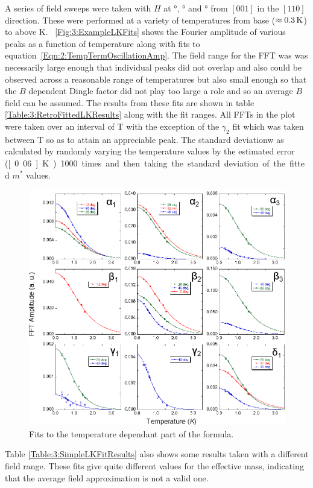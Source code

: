 A series of field sweeps were taken with $H$ at \unit[12]{\degree}, \unit[28]{\degree} and \unit[46]{\degree} from $[001]$ in the $[110]$ direction. These were performed at a variety of temperatures from base ($\approx\unit[0.3]{K}$) to above \unit[2]{K}. \Fig~\ref{Fig:3:ExampleLKFits} shows the Fourier amplitude of various peaks as a function of temperature along with fits to equation~\ref{Eqn:2:TempTermOscillationAmp}. The field range for the FFT was was necessarily large enough that individual peaks did not overlap and also could be observed across a reasonable range of temperatures but also small enough so that the $B$ dependent Dingle factor did not play too large a role and so an average $B$ field can be assumed. The results from these fits are shown in table \ref{Table:3:RetroFittedLKResults} along with the fit ranges. All FFTs in the plot were taken over an interval of \unit[12--18]{T} with the exception of the $\gamma_2$ fit which was taken between \unit[16-18]{T} so as to attain an appreciable peak. The standard deviationw as calculated by randomly varying the temperature values by the estimated error (\unit[0.06]{K}) 1000 times and then taking the standard deviation of the fitted $m^*$ values.
\begin{figure}[h!]
    \begin{center}
        \includegraphics[scale=0.9]{Chapter3-dHvABaFe2P2/Figures/Mass/SimpleLKFits/SimpleLKFits}
        \caption{Fits to the temperature dependant part of the \LK formula. }
        \label{Fig:3:SimpleLKFits}
    \end{center}
\end{figure}
Table \ref{Table:3:SimpleLKFitResults} also shows some results taken with a different field range. These fits give quite different values for the effective mass, indicating that the average field approximation is not a valid one.

